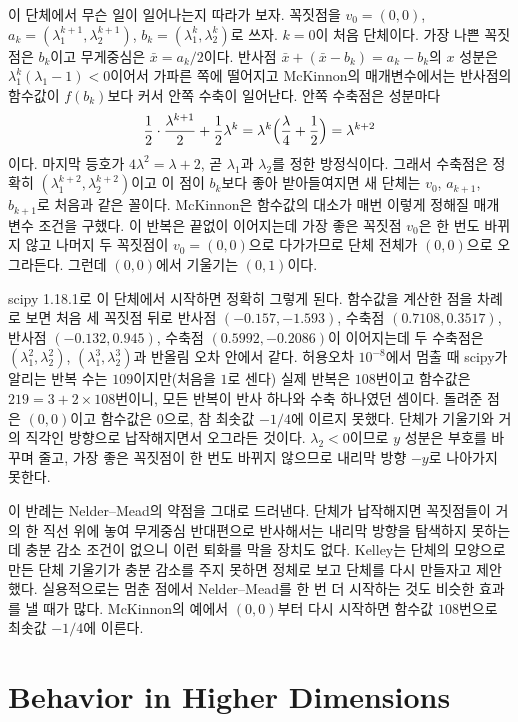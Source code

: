 이 단체에서 무슨 일이 일어나는지 따라가 보자. 꼭짓점을 $v_0=(0,0)$, $a_k=(\lambda_1^{k+1},\lambda_2^{k+1})$, $b_k=(\lambda_1^k,\lambda_2^k)$로 쓰자. $k=0$이 처음 단체이다. 가장 나쁜 꼭짓점은 $b_k$이고 무게중심은 $\bar x=a_k/2$이다. 반사점 $\bar x+(\bar x-b_k)=a_k-b_k$의 $x$ 성분은 $\lambda_1^k(\lambda_1-1)<0$이어서 가파른 쪽에 떨어지고 McKinnon의 매개변수에서는 반사점의 함수값이 $f(b_k)$보다 커서 안쪽 수축이 일어난다. 안쪽 수축점은 성분마다
\[
\frac12\cdot\frac{\lambda^{k+1}}2+\frac12\lambda^k=\lambda^k\Bigl(\frac\lambda4+\frac12\Bigr)=\lambda^{k+2}
\]
이다. 마지막 등호가 $4\lambda^2=\lambda+2$, 곧 $\lambda_1$과 $\lambda_2$를 정한 방정식이다. 그래서 수축점은 정확히 $(\lambda_1^{k+2},\lambda_2^{k+2})$이고 이 점이 $b_k$보다 좋아 받아들여지면 새 단체는 $v_0$, $a_{k+1}$, $b_{k+1}$로 처음과 같은 꼴이다. McKinnon은 함수값의 대소가 매번 이렇게 정해질 매개변수 조건을 구했다. 이 반복은 끝없이 이어지는데 가장 좋은 꼭짓점 $v_0$은 한 번도 바뀌지 않고 나머지 두 꼭짓점이 $v_0=(0,0)$으로 다가가므로 단체 전체가 $(0,0)$으로 오그라든다. 그런데 $(0,0)$에서 기울기는 $(0,1)$이다.

scipy 1.18.1로 이 단체에서 시작하면 정확히 그렇게 된다. 함수값을 계산한 점을 차례로 보면 처음 세 꼭짓점 뒤로 반사점 $(-0.157,-1.593)$, 수축점 $(0.7108,0.3517)$, 반사점 $(-0.132,0.945)$, 수축점 $(0.5992,-0.2086)$이 이어지는데 두 수축점은 $(\lambda_1^2,\lambda_2^2)$, $(\lambda_1^3,\lambda_2^3)$과 반올림 오차 안에서 같다. 허용오차 $10^{-8}$에서 멈출 때 scipy가 알리는 반복 수는 $109$이지만(처음을 $1$로 센다) 실제 반복은 $108$번이고 함수값은 $219=3+2\times108$번이니, 모든 반복이 반사 하나와 수축 하나였던 셈이다. 돌려준 점은 $(0,0)$이고 함수값은 $0$으로, 참 최솟값 $-1/4$에 이르지 못했다. 단체가 기울기와 거의 직각인 방향으로 납작해지면서 오그라든 것이다. $\lambda_2<0$이므로 $y$ 성분은 부호를 바꾸며 줄고, 가장 좋은 꼭짓점이 한 번도 바뀌지 않으므로 내리막 방향 $-y$로 나아가지 못한다.

이 반례는 Nelder--Mead의 약점을 그대로 드러낸다. 단체가 납작해지면 꼭짓점들이 거의 한 직선 위에 놓여 무게중심 반대편으로 반사해서는 내리막 방향을 탐색하지 못하는데 충분 감소 조건이 없으니 이런 퇴화를 막을 장치도 없다. Kelley는 단체의 모양으로 만든 단체 기울기가 충분 감소를 주지 못하면 정체로 보고 단체를 다시 만들자고 제안했다\cite{kelley1999}. 실용적으로는 멈춘 점에서 Nelder--Mead를 한 번 더 시작하는 것도 비슷한 효과를 낼 때가 많다. McKinnon의 예에서 $(0,0)$부터 다시 시작하면 함수값 $108$번으로 최솟값 $-1/4$에 이른다.

\section{Behavior in Higher Dimensions}
\label{sec:nm-dimension}

